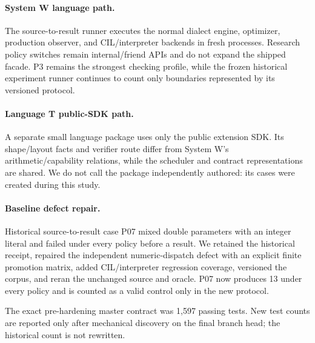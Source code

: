\paragraph{System W language path.}
The source-to-result runner executes the normal dialect engine, optimizer, production observer, and CIL/interpreter backends in fresh processes. Research policy switches remain internal/friend APIs and do not expand the shipped facade. P3 remains the strongest checking profile, while the frozen historical experiment runner continues to count only boundaries represented by its versioned protocol.

\paragraph{Language T public-SDK path.}
A separate small language package uses only the public extension SDK. Its shape/layout facts and verifier route differ from System W's arithmetic/capability relations, while the scheduler and contract representations are shared. We do not call the package independently authored: its cases were created during this study.

\paragraph{Baseline defect repair.}
Historical source-to-result case P07 mixed double parameters with an integer literal and failed under every policy before a result. We retained the historical receipt, repaired the independent numeric-dispatch defect with an explicit finite promotion matrix, added CIL/interpreter regression coverage, versioned the corpus, and reran the unchanged source and oracle. P07 now produces 13 under every policy and is counted as a valid control only in the new protocol.

The exact pre-hardening master contract was 1,597 passing tests. New test counts are reported only after mechanical discovery on the final branch head; the historical count is not rewritten.

